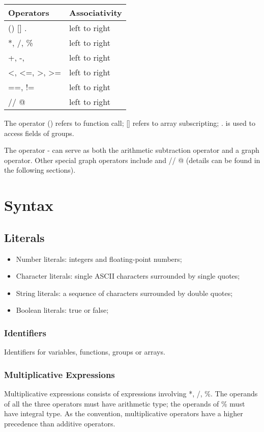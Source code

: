 \documentclass[11pt,letterpaper]{article}
\begin{document}
\begin{center}
    \begin{tabular}{| p{4cm} | p{4cm} |}		\hline
    Operators 		& Associativity \\ 		\hline \hline
    () [] . 			& left to right \\ 		\hline
    *, /, \% 		& left to right \\ 		\hline
    +, -, \textbar	& left to right \\ 		\hline
    \textless,  \textless=,  \textgreater,  \textgreater=	& left to right \\ 		\hline
    ==,  !=			& left to right \\ 		\hline
    // @				& left to right \\ 		\hline
    
    \end{tabular}
\end{center}

The operator () refers to function call; [] refers to array subscripting; . is used to access fields of groups. 

The operator - can serve as both the arithmetic subtraction operator and a graph operator.  Other special graph operators include \textbar and // @ (details can be found in the following sections).

\section {Syntax}
\subsection {Literals}
\begin{itemize}
\item Number literals: integers and floating-point numbers;
\item Character literals: single ASCII characters surrounded by single quotes;
\item String literals: a sequence of characters surrounded by double quotes;
\item Boolean literals: true or false;
\end{itemize}
\subsubsection {Identifiers}
Identifiers for variables, functions, groups or arrays.

\subsubsection {Multiplicative Expressions}
Multiplicative expressions consists of expressions involving *, /, \%. The operands of all the three operators must have arithmetic type; the operands of \% must have integral type. As the convention, multiplicative operators have a higher precedence than additive operators. 
\end{document}
